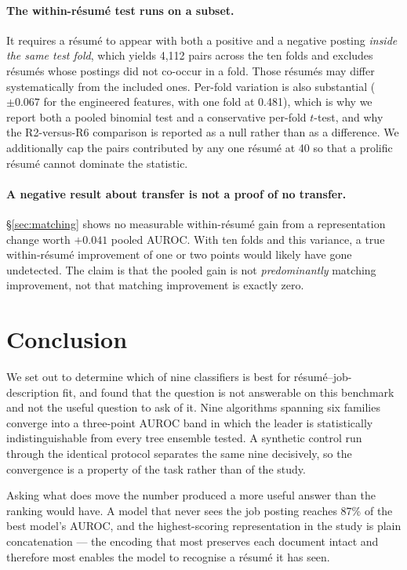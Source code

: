 \documentclass[11pt]{article}                      %
\begin{document}
\paragraph{The within-résumé test runs on a subset.}
It requires a résumé to appear with both a positive and a negative posting
\emph{inside the same test fold}, which yields 4{,}112 pairs across the ten folds
and excludes résumés whose postings did not co-occur in a fold. Those résumés may
differ systematically from the included ones. Per-fold variation is also
substantial ($\pm 0.067$ for the engineered features, with one fold at 0.481),
which is why we report both a pooled binomial test and a conservative per-fold
$t$-test, and why the R2-versus-R6 comparison is reported as a null rather than
as a difference. We additionally cap the pairs contributed by any one résumé at
40 so that a prolific résumé cannot dominate the statistic.

\paragraph{A negative result about transfer is not a proof of no transfer.}
\S\ref{sec:matching} shows no measurable within-résumé gain from a representation
change worth $+0.041$ pooled AUROC. With ten folds and this variance, a true
within-résumé improvement of one or two points would likely have gone undetected.
The claim is that the pooled gain is not \emph{predominantly} matching
improvement, not that matching improvement is exactly zero.

\section{Conclusion}

We set out to determine which of nine classifiers is best for résumé--job-description
fit, and found that the question is not answerable on this benchmark and not the
useful question to ask of it. Nine algorithms spanning six families converge into
a three-point AUROC band in which the leader is statistically indistinguishable
from every tree ensemble tested. A synthetic control run through the identical
protocol separates the same nine decisively, so the convergence is a property of
the task rather than of the study.

Asking what does move the number produced a more useful answer than the ranking
would have. A model that never sees the job posting reaches 87\% of the best
model's AUROC, and the highest-scoring representation in the study is plain
concatenation --- the encoding that most preserves each document intact and
therefore most enables the model to recognise a résumé it has seen.
\end{document}
